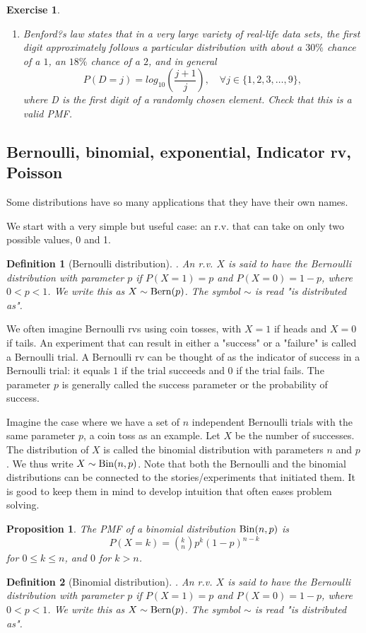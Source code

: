 \documentclass[12pt,a4paper]{article}
\newtheorem{proposition}{Proposition}
\newtheorem{definition}{Definition}
\newtheorem{exercise}{Exercise}
\begin{document}
\begin{exercise}
	\begin{enumerate}
		\item Benford?s law states that in a very large variety of real-life data sets, the first digit
		approximately follows a particular distribution with about a $30\%$ chance of a $1$, an $18\%$
		chance of a $2$, and in general
		\begin{equation}
			P (D = j) = log_{10}\left(\frac{j+1}j\right),\quad\forall j \in \{1,2,3,\ldots,9\},
		\end{equation}
		where D is the first digit of a randomly chosen element. Check that this is a valid PMF.
	\end{enumerate}
\end{exercise}
	
\subsection{Bernoulli, binomial, exponential, Indicator rv, Poisson}
Some distributions have so many applications that they have
their own names.

We start with a very simple but useful case: an r.v. that can take on only two possible values, 0 and 1.
\begin{definition}[Bernoulli distribution]. 
	An r.v. $X$ is said to have the Bernoulli distribution with parameter $p$ if $P (X = 1) = p$ and $P (X = 0) = 1-p$, where $0<p<1$. We write this as $X \sim {\rm Bern}(p)$. The symbol $\sim$ is read "is distributed as".
\end{definition}
We often imagine Bernoulli rvs using coin tosses, with $X=1$ if heads and $X=0$ if tails.
An experiment that can result in either a "success"
or a "failure" is called a Bernoulli trial. 
A Bernoulli rv can be thought of as the indicator of success in a Bernoulli trial: it equals $1$ if the trial succeeds and $0$ if the trial fails.
The parameter $p$ is generally called the success parameter or the probability of success.

Imagine the case where we have a set of $n$ independent Bernoulli trials with the same parameter $p$, a coin toss as an example.
Let $X$ be the number of successes. The distribution of $X$ is called the binomial distribution with parameters $n$ and $p$. We thus write $X\sim{\rm Bin}(n,p)$.
Note that both the Bernoulli and the binomial distributions can be connected to the stories/experiments that initiated them. 
It is good to keep them in mind to develop intuition that often eases problem solving.
\begin{proposition}
	The PMF of a binomial distribution ${\rm Bin}(n,p)$ is 
	\begin{equation}
		P(X=k) = \left(^k_n\right) p^k (1-p)^{n-k}
	\end{equation}
	for $0\leq k\leq n$, and $0$ for $k>n$.
\end{proposition}
\begin{definition}[Binomial distribution]. 
	An r.v. $X$ is said to have the Bernoulli distribution with parameter $p$ if $P (X = 1) = p$ and $P (X = 0) = 1-p$, where $0<p<1$. We write this as $X \sim {\rm Bern}(p)$. The symbol $\sim$ is read "is distributed as".
\end{definition}
\end{document}
